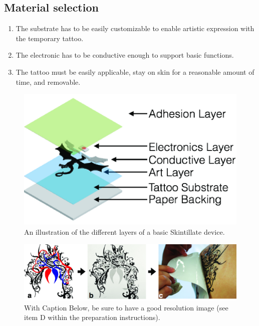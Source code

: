 \documentclass{sigchi}
\begin{document}
\subsection{Material selection}
\begin{enumerate}
  \item The substrate has to be easily customizable to enable artistic expression with the temporary tattoo.
  \item The electronic has to be conductive enough to support basic functions. %
  \item The tattoo must be easily applicable, stay on skin for a reasonable amount of time, and removable.
\end{enumerate}
\begin{figure}[!h]
\centering
\includegraphics[width=0.9\columnwidth]{figures/Figure3}
\caption{An illustration of the different layers of a basic Skintillate device.}
\label{fig:figure3}
\end{figure}

\begin{figure}[!b]
\centering
\includegraphics[width=1.0\textwidth]{figures/Figure4}
\caption{With Caption Below, be sure to have a good resolution image
  (see item D within the preparation instructions).}
\label{fig:figure4}
\end{figure}
\end{document}
